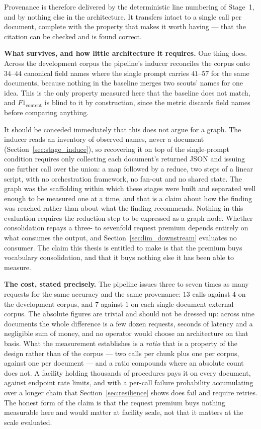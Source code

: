 \documentclass[11pt]{article}
\begin{document}
Provenance is therefore delivered by the deterministic line numbering of
Stage~1, and by nothing else in the architecture. It transfers intact to a
single call per document, complete with the property that makes it worth having
--- that the citation can be checked and is found correct.

\textbf{What survives, and how little architecture it requires.} One thing does.
Across the development corpus the pipeline's inducer reconciles the corpus onto
$34$--$44$ canonical field names where the single prompt carries $41$--$57$ for
the same documents, because nothing in the baseline merges two scouts' names for
one idea. This is the only property measured here that the baseline does not
match, and $F1_{\text{content}}$ is blind to it by construction, since the metric
discards field names before comparing anything.

It should be conceded immediately that this does not argue for a graph. The
inducer reads an inventory of observed names, never a document
(Section~\ref{sec:stage_induce}), so recovering it on top of the single-prompt
condition requires only collecting each document's returned JSON and issuing one
further call over the union: a map followed by a reduce, two steps of a linear
script, with no orchestration framework, no fan-out and no shared state. The
graph was the scaffolding within which these stages were built and separated
well enough to be measured one at a time, and that is a claim about how the
finding was reached rather than about what the finding recommends. Nothing in
this evaluation requires the reduction step to be expressed as a graph node. Whether consolidation repays a
three- to sevenfold request premium depends entirely on what consumes the
output, and Section~\ref{sec:lim_downstream} evaluates no consumer. The claim
this thesis is entitled to make is that the premium buys vocabulary
consolidation, and that it buys nothing else it has been able to measure.

\textbf{The cost, stated precisely.} The pipeline issues three to seven times as
many requests for the same accuracy and the same provenance: $13$ calls against
$4$ on the development corpus, and $7$ against $1$ on each single-document
external corpus. The absolute figures are trivial and should not be dressed up:
across nine documents the whole difference is a few dozen requests, seconds of
latency and a negligible sum of money, and no operator would choose an
architecture on that basis. What the measurement establishes is a \emph{ratio}
that is a property of the design rather than of the corpus --- two calls per
chunk plus one per corpus, against one per document --- and a ratio compounds
where an absolute count does not. A facility holding thousands of procedures
pays it on every document, against endpoint rate limits, and with a per-call
failure probability accumulating over a longer chain that
Section~\ref{sec:resilience} shows does fail and require retries. The honest
form of the claim is that the request premium buys nothing measurable here and
would matter at facility scale, not that it matters at the scale evaluated.
\end{document}
